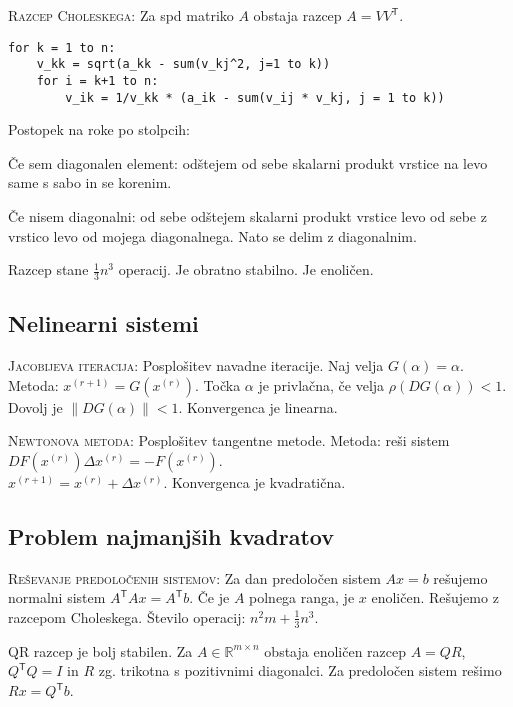 \documentclass[a4paper,10pt]{article}
\theoremstyle{definition}
\def\R{\mathbb{R}}
\newenvironment{enumerate*}%
{
\vspace{-6pt}
\begin{enumerate}
\setlength{\itemsep}{0pt}
\setlength{\parskip}{2pt}
}
{\end{enumerate}}
\begin{document}
\textsc{Razcep Choleskega:}
Za spd matriko $A$ obstaja razcep $A = VV^\mathsf{T}$.
\scriptsize
\begin{verbatim}
for k = 1 to n:
    v_kk = sqrt(a_kk - sum(v_kj^2, j=1 to k))
    for i = k+1 to n:
        v_ik = 1/v_kk * (a_ik - sum(v_ij * v_kj, j = 1 to k))
\end{verbatim}
\normalsize
Postopek na roke po stolpcih:
\begin{enumerate*}
  \item Če sem diagonalen element: odštejem od sebe skalarni produkt vrstice na
    levo same s sabo in se korenim.
  \item Če nisem diagonalni: od sebe odštejem skalarni produkt vrstice levo od
    sebe z vrstico levo od mojega diagonalnega. Nato se delim z
    diagonalnim.
\end{enumerate*}

Razcep stane $\frac13n^3$ operacij. Je obratno stabilno. Je enoličen.

\subsection*{Nelinearni sistemi}

\textsc{Jacobijeva iteracija:}
Posplošitev navadne iteracije. Naj velja $G(\alpha)= \alpha$. Metoda: $x^{(r+1)}
= G(x^{(r)})$. Točka $\alpha$ je privlačna, če velja $\rho(DG(\alpha)) < 1$.
Dovolj je $\|DG(\alpha)\| < 1$.  Konvergenca je linearna.

\textsc{Newtonova metoda:}
Posplošitev tangentne metode. Metoda: reši sistem $DF(x^{(r)})\Delta x^{(r)} =
-F(x^{(r)})$. \\ $x^{(r+1)} = x^{(r)} + \Delta x^{(r)}$. Konvergenca je
kvadratična.

\subsection*{Problem najmanjših kvadratov}

\textsc{Reševanje predoločenih sistemov:} Za dan predoločen sistem $Ax=b$
rešujemo normalni sistem $A^\mathsf{T}Ax=A^\mathsf{T}b$. Če je $A$ polnega ranga, je $x$ enoličen.
Rešujemo z razcepom Choleskega. Število operacij: $n^2m + \frac13n^3$.

QR razcep je bolj stabilen. Za $A \in \R^{m\times n}$ obstaja enoličen razcep $A = QR$, $Q^\mathsf{T}Q =
I$ in $R$ zg. trikotna s pozitivnimi diagonalci. Za predoločen sistem rešimo $Rx
= Q^\mathsf{T}b$.
\end{document}
